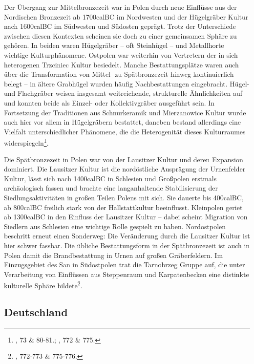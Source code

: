 \documentclass[openany,twoside,twocolumn]{book}
\let\rmarkdownfootnote\footnote%
\def\footnote{\protect\rmarkdownfootnote}
\begin{document}
Der Übergang zur Mittelbronzezeit war in Polen durch neue Einflüsse aus
der Nordischen Bronzezeit ab 1700calBC im Nordwesten und der Hügelgräber
Kultur nach 1600calBC im Südwesten und Südosten geprägt. Trotz der
Unterschiede zwischen diesen Kontexten scheinen sie doch zu einer
gemeinsamen Sphäre zu gehören. In beiden waren Hügelgräber -- oft
Steinhügel -- und Metallhorte wichtige Kulturphänomene. Ostpolen war
weiterhin von Vertretern der in sich heterogenen Trzciniec Kultur
besiedelt. Manche Bestattungsplätze waren auch über die Transformation
von Mittel- zu Spätbronzezeit hinweg kontinuierlich belegt -- in ältere
Grabhügel wurden häufig Nachbestattungen eingebracht. Hügel- und
Flachgräber weisen insgesamt weitreichende, strukturelle Ähnlichkeiten
auf und konnten beide als Einzel- oder Kollektivgräber ausgeführt sein.
In Fortsetzung der Traditionen aus Schnurkeramik und Mierzanowice Kultur
wurde auch hier vor allem in Hügelgräbern bestattet, daneben bestand
allerdings eine Vielfalt unterschiedlicher Phänomene, die die
Heterogenität dieses Kulturraumes widerspiegeln\footnote{\textcite{dabrowski_aeltere_2004},
  73 \& 80-81.; \textcite{czebreszuk_bronze_2013}, 772 \& 775.}.

Die Spätbronzezeit in Polen war von der Lausitzer Kultur und deren
Expansion dominiert. Die Lausitzer Kultur ist die nordöstliche
Ausprägung der Urnenfelder Kultur, lässt sich nach 1400calBC in
Schlesien und Großpolen erstmals archäologisch fassen und brachte eine
langanhaltende Stabilisierung der Siedlungsaktivitäten in großen Teilen
Polens mit sich. Sie dauerte bis 400calBC, ab 800calBC freilich stark
von der Hallstattkultur beeinflusst. Kleinpolen geriet ab 1300calBC in
den Einfluss der Lausitzer Kultur -- dabei scheint Migration von
Siedlern aus Schlesien eine wichtige Rolle gespielt zu haben.
Nordostpolen beschritt erneut einen Sonderweg: Die Veränderung durch die
Lausitzer Kultur ist hier schwer fassbar. Die übliche Bestattungsform in
der Spätbronzezeit ist auch in Polen damit die Brandbestattung in Urnen
auf großen Gräberfeldern. Im Einzugsgebiet des San in Südostpolen trat
die Tarnobrzeg Gruppe auf, die unter Verarbeitung von Einflüssen aus
Steppenraum und Karpatenbecken eine distinkte kulturelle Sphäre
bildete\footnote{\textcite{czebreszuk_bronze_2013}, 772-773 \& 775-776.}.

\hypertarget{deutschland}{%
\subsection{Deutschland}\label{deutschland}}
\end{document}
